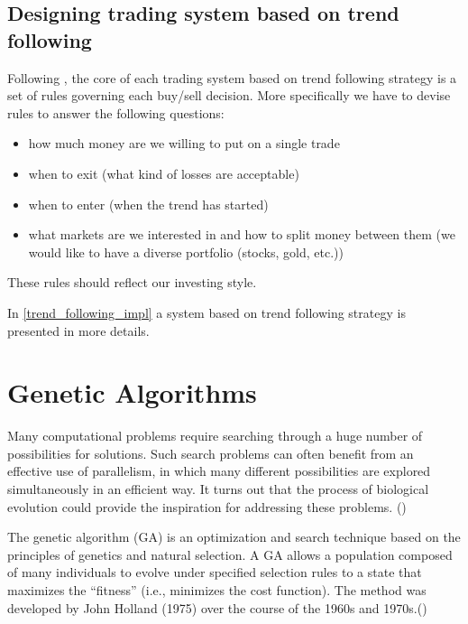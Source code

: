 \subsection{Designing trading system based on trend following} 

Following \cite{Trend01}, the core of each trading system based on trend following strategy is a set of rules governing each buy/sell decision.
More specifically we have to devise rules to answer the following questions:

\begin{itemize}
  \item how much money are we willing to put on a single trade
  \item when to exit (what kind of losses are acceptable)
  \item when to enter (when the trend has started) 
  \item what markets are we interested in and how to split money between them (we would like to have a diverse portfolio (stocks, gold, etc.))
\end{itemize}

These rules should reflect our investing style.

In \ref{trend_following_impl} a system based on trend following strategy is presented in more details.


\section{Genetic Algorithms}
\label{sec:genAlgorithms}

Many computational problems require searching through a huge number of possibilities for solutions.
Such search problems can often benefit from an effective use of parallelism, in which many different possibilities are explored simultaneously in an efficient way. 
It turns out that the process of biological evolution could provide the inspiration for addressing these problems.
(\cite{Mitchell01})

The genetic algorithm (GA) is an optimization and search technique based on the principles of genetics and natural selection.
A GA allows a population composed of many individuals to evolve under specified selection rules to a state that maximizes the “fitness” (i.e., minimizes the cost function).
The method was developed by John Holland (1975) over the course of the 1960s and 1970s.(\cite{Haupt:2004:PGA:1007746})



